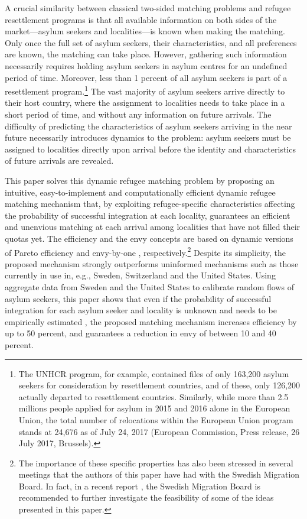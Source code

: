 \documentclass[12pt,fleqn]{article}
\begin{document}
A crucial similarity between classical two-sided matching problems and refugee resettlement programs is that all available information on both sides of the market---asylum seekers and localities---is known when making the matching. Only once the full set of asylum seekers, their characteristics, and all preferences are known, the matching can take place. However, gathering such information necessarily requires holding asylum seekers in asylum centres for an undefined period of time. Moreover, less than 1 percent of all asylum seekers is part of a resettlement program.\footnote{The UNHCR program, for example, contained files of only 163,200 asylum seekers for consideration by resettlement countries, and of these, only 126,200 actually departed to resettlement countries. Similarly, while more than 2.5 millions people applied for asylum in 2015 and 2016 alone in the European Union, the total number of relocations within the European Union program stands at 24,676 as of July 24, 2017 (European Commission, Press release, 26 July 2017, Brussels).} The vast majority of asylum seekers arrive directly to their host country, where the assignment to localities needs to take place in a short period of time, and without any information on future arrivals. The difficulty of predicting the characteristics of asylum seekers arriving in the near future necessarily introduces dynamics to the problem: asylum seekers must be assigned to localities directly upon arrival before the identity and characteristics of future arrivals are revealed.

This paper solves this dynamic refugee matching problem by proposing an intuitive, easy-to-implement and computationally efficient dynamic refugee matching mechanism that, by exploiting refugee-specific characteristics affecting the probability of successful integration at each locality, guarantees an efficient and unenvious matching at each arrival among localities that have not filled their quotas yet. The efficiency and the envy concepts are based on dynamic versions of Pareto efficiency and envy-by-one \citep{bib:Budish}, respectively.\footnote{The importance of these specific properties has also been stressed in several meetings that the authors of this paper have had with the Swedish Migration Board. In fact, in a recent report \citep[Swedish Government,][]{SOU2018}, the Swedish Migration Board is recommended to further investigate the feasibility of some of the ideas presented in this paper.} Despite its simplicity, the proposed mechanism strongly outperforms uninformed mechanisms such as those currently in use in, e.g., Sweden, Switzerland and the United States. Using aggregate data from Sweden and the United States to calibrate random flows of asylum seekers, this paper shows that even if the probability of successful integration for each asylum seeker and locality is unknown and needs to be empirically estimated \citep[as in][]{bib:BansakEtAl}, the proposed matching mechanism increases efficiency by up to 50 percent, and guarantees a reduction in envy of between 10 and 40 percent.
\end{document}
